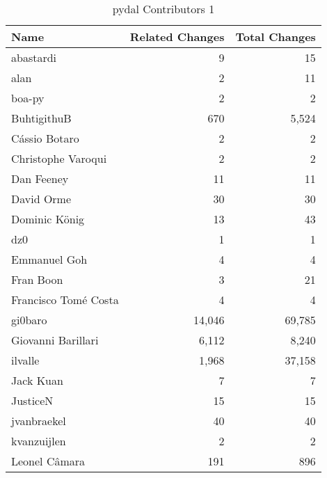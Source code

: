 \documentclass[a4paper,man,natbib,floatsintext]{apa6}
\begin{document}
\begin{table}[ht]
\caption{pydal Contributors 1}
\label{tab:contribs-2.1}
\begin{tabular}{|l|r|r|}
\hline
Name                 & Related Changes & Total Changes \\ \hline
abastardi            & 9               & 15            \\ \hline
alan                 & 2               & 11            \\ \hline
boa-py               & 2               & 2             \\ \hline
BuhtigithuB          & 670             & 5,524         \\ \hline
Cássio Botaro        & 2               & 2             \\ \hline
Christophe Varoqui   & 2               & 2             \\ \hline
Dan Feeney           & 11              & 11            \\ \hline
David Orme           & 30             & 30            \\ \hline
Dominic König        & 13              & 43            \\ \hline
dz0                  & 1               & 1             \\ \hline
Emmanuel Goh         & 4               & 4             \\ \hline
Fran Boon            & 3               & 21            \\ \hline
Francisco Tomé Costa & 4               & 4             \\ \hline
gi0baro              & 14,046          & 69,785        \\ \hline
Giovanni Barillari   & 6,112           & 8,240         \\ \hline
ilvalle              & 1,968           & 37,158        \\ \hline
Jack Kuan            & 7               & 7             \\ \hline
JusticeN             & 15              & 15            \\ \hline
jvanbraekel          & 40              & 40            \\ \hline
kvanzuijlen          & 2               & 2             \\ \hline
Leonel Câmara        & 191             & 896           \\ \hline
\end{tabular}
\end{table}
\end{document}
